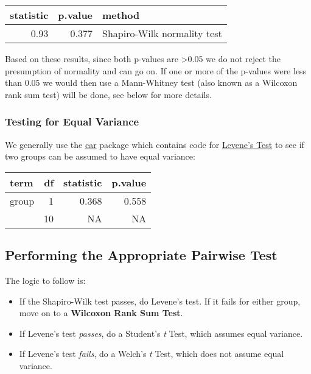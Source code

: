 \documentclass[]{article}
\newenvironment{Shaded}{\begin{snugshade}}{\end{snugshade}}
\newcommand{\KeywordTok}[1]{\textcolor[rgb]{0.13,0.29,0.53}{\textbf{{#1}}}}
\newcommand{\DataTypeTok}[1]{\textcolor[rgb]{0.13,0.29,0.53}{{#1}}}
\newcommand{\StringTok}[1]{\textcolor[rgb]{0.31,0.60,0.02}{{#1}}}
\newcommand{\CommentTok}[1]{\textcolor[rgb]{0.56,0.35,0.01}{\textit{{#1}}}}
\newcommand{\NormalTok}[1]{{#1}}
\providecommand{\tightlist}{%
  \setlength{\itemsep}{0pt}\setlength{\parskip}{0pt}}
\begin{document}
\begin{longtable}[]{@{}rrl@{}}
\toprule
statistic & p.value & method\tabularnewline
\midrule
\endhead
0.93 & 0.377 & Shapiro-Wilk normality test\tabularnewline
\bottomrule
\end{longtable}

Based on these results, since both p-values are \textgreater{}0.05 we do
not reject the presumption of normality and can go on. If one or more of
the p-values were less than 0.05 we would then use a Mann-Whitney test
(also known as a Wilcoxon rank sum test) will be done, see below for
more details.

\subsubsection{Testing for Equal
Variance}\label{testing-for-equal-variance}

We generally use the
\href{https://cran.r-project.org/web/packages/car/index.html}{car}
package which contains code for
\href{https://en.wikipedia.org/wiki/Levene\%27s_test}{Levene's Test} to
see if two groups can be assumed to have equal variance:

\begin{Shaded}
\end{Shaded}

\begin{longtable}[]{@{}lrrr@{}}
\toprule
term & df & statistic & p.value\tabularnewline
\midrule
\endhead
group & 1 & 0.368 & 0.558\tabularnewline
& 10 & NA & NA\tabularnewline
\bottomrule
\end{longtable}

\subsection{Performing the Appropriate Pairwise
Test}\label{performing-the-appropriate-pairwise-test}

The logic to follow is:

\begin{itemize}
\tightlist
\item
  If the Shapiro-Wilk test passes, do Levene's test. If it fails for
  either group, move on to a \textbf{Wilcoxon Rank Sum Test}.
\item
  If Levene's test \emph{passes}, do a Student's \emph{t} Test, which
  assumes equal variance.
\item
  If Levene's test \emph{fails}, do a Welch's \emph{t} Test, which does
  not assume equal variance.
\end{itemize}
\end{document}

